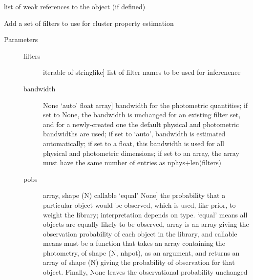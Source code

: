 \documentclass[letterpaper,10pt,english]{sphinxmanual}
\begin{document}
\begin{fulllineitems}
\begin{fulllineitems}
\label{\detokenize{cluster_slug:slugpy.cluster_slug.cluster_slug.__weakref__}}
list of weak references to the object (if defined)

\end{fulllineitems}


\begin{fulllineitems}
\label{\detokenize{cluster_slug:slugpy.cluster_slug.cluster_slug.add_filters}}
Add a set of filters to use for cluster property estimation
\begin{description}
\item[{Parameters}] \leavevmode\begin{description}
\item[{filters}] \leavevmode{[}iterable of stringlike{]}
list of filter names to be used for inferenence

\item[{bandwidth}] \leavevmode{[}None \textbar{} ‘auto’ \textbar{} float \textbar{} array{]}
bandwidth for the photometric quantities; if set to
None, the bandwidth is unchanged for an existing filter
set, and for a newly-created one the default physical
and photometric bandwidths are used; if set to ‘auto’,
bandwidth is estimated automatically; if set to a float,
this bandwidth is used for all physical and photometric
dimensions; if set to an array, the array must have the
same number of entries as nphys+len(filters)

\item[{pobs}] \leavevmode{[}array, shape (N) \textbar{} callable \textbar{} ‘equal’ \textbar{} None{]}
the probability that a particular object would be observed,
which is used, like prior, to weight the library;
interpretation depends on type. ‘equal’ means all objects are
equally likely to be observed, array is an array giving the
observation probability of each object in the library, and
callable means must be a function that takes an array
containing the photometry, of shape (N, nhpot), as an
argument, and returns an array of shape (N) giving the
probability of observation for that object. Finally,
None leaves the observational probability unchanged

\end{description}


\end{description}
\end{fulllineitems}
\end{fulllineitems}
\end{document}
